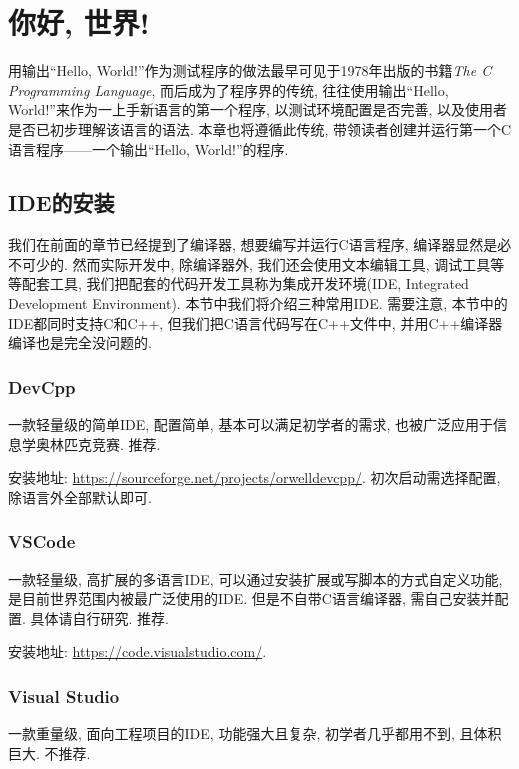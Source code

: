 \chapter{你好, 世界!} \label{你好, 世界!}
    用输出``Hello, World!''作为测试程序的做法最早可见于1978年出版的书籍\emph{The C Programming Language}, 而后成为了程序界的传统, 往往使用输出``Hello, World!''来作为一上手新语言的第一个程序, 以测试环境配置是否完善, 以及使用者是否已初步理解该语言的语法. 本章也将遵循此传统, 带领读者创建并运行第一个C语言程序——一个输出``Hello, World!''的程序.

    \section{IDE的安装}
        我们在前面的章节已经提到了编译器, 想要编写并运行C语言程序, 编译器显然是必不可少的. 然而实际开发中, 除编译器外, 我们还会使用文本编辑工具, 调试工具等等配套工具, 我们把配套的代码开发工具称为集成开发环境(IDE, Integrated Development Environment). 本节中我们将介绍三种常用IDE. 需要注意, 本节中的IDE都同时支持C和C++, 但我们把C语言代码写在C++文件中, 并用C++编译器编译也是完全没问题的.
        
        \subsection*{DevCpp}
            一款轻量级的简单IDE, 配置简单, 基本可以满足初学者的需求, 也被广泛应用于信息学奥林匹克竞赛. 推荐.

            安装地址: \href{https://sourceforge.net/projects/orwelldevcpp/}{https://sourceforge.net/projects/orwelldevcpp/}. 初次启动需选择配置, 除语言外全部默认即可.

        \subsection*{VSCode}
            一款轻量级, 高扩展的多语言IDE, 可以通过安装扩展或写脚本的方式自定义功能, 是目前世界范围内被最广泛使用的IDE. 但是不自带C语言编译器, 需自己安装并配置. 具体请自行研究. 推荐.

            安装地址: \href{https://code.visualstudio.com/}{https://code.visualstudio.com/}.

        \subsection*{Visual Studio}
            一款重量级, 面向工程项目的IDE, 功能强大且复杂, 初学者几乎都用不到, 且体积巨大. 不推荐.

